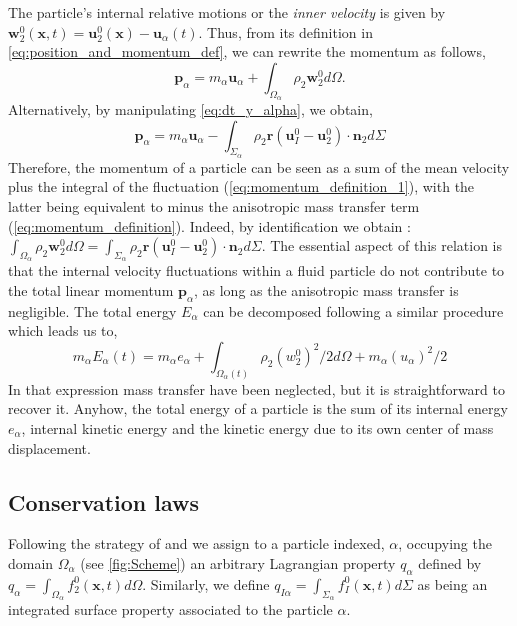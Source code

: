 The particle's internal relative motions or the \textit{inner velocity} is given by $\textbf{w}_2^0(\textbf{x},t) = \textbf{u}_2^0(\textbf{x}) - \textbf{u}_\alpha(t)$.
Thus, from its definition in \ref{eq:position_and_momentum_def}, we can rewrite the momentum as follows,
\begin{equation}
    \label{eq:momentum_definition_1}
    \textbf{p}_\alpha
    = m_\alpha \textbf{u}_\alpha
    + \int_{\Omega_\alpha} \rho_2 \textbf{w}_2^0 d\Omega.
\end{equation}
Alternatively, by manipulating \ref{eq:dt_y_alpha}, we obtain,
\begin{equation}
    \textbf{p}_\alpha
    =  m_\alpha \textbf{u}_\alpha
    - \int_{\Sigma_\alpha} \rho_2\textbf{r}(\textbf{u}_I^0 - \textbf{u}_2^0)\cdot \textbf{n}_2 d\Sigma
    \label{eq:momentum_definition}
\end{equation}
Therefore, the momentum of a particle can be seen as a sum of the mean velocity plus the integral of the fluctuation (\ref{eq:momentum_definition_1}), with the latter being equivalent to minus the anisotropic mass transfer term (\ref{eq:momentum_definition}).
Indeed, by identification we obtain : $\int_{\Omega_\alpha} \rho_2 \textbf{w}_2^0 d\Omega =\int_{\Sigma_\alpha}  \rho_2\textbf{r} (\textbf{u}_I^0 - \textbf{u}_2^0)\cdot \textbf{n}_2 d\Sigma$. 
The essential aspect of this relation is that the internal velocity fluctuations within a fluid particle do not contribute to the total linear momentum $\textbf{p}_\alpha$, as long as the anisotropic mass transfer is negligible.  
The total energy $E_\alpha$ can be decomposed following a similar procedure which leads us to, 
\begin{equation*}
    \label{eq:E_alpha_def}
    m_\alpha E_\alpha(t) 
    = m_\alpha e_\alpha 
    + \int_{\Omega_\alpha(t)} \rho_2  (w_2^0)^2/2 d\Omega
    + m_\alpha (u_\alpha)^2/2
\end{equation*}
In that expression mass transfer have been neglected, but it is straightforward to recover it. 
Anyhow, the total energy of a particle is the sum of its internal energy $e_\alpha$, internal kinetic energy and the kinetic energy due to its own center of mass displacement. 


\subsection{Conservation laws}
Following the strategy of \citet{zaepffel2011modelisation} and \citet[Chapter 2]{morel2015mathematical} we assign to a particle indexed, $\alpha$, occupying the domain $\Omega_\alpha$ (see \ref{fig:Scheme}) an arbitrary Lagrangian property $q_\alpha$ defined by $q_\alpha  = \int_{\Omega_\alpha} f_2^0(\textbf{x},t) d\Omega$.
Similarly, we define $q_{I\alpha} = \int_{\Sigma_\alpha} f_I^0(\textbf{x},t) d\Sigma$ as being an integrated surface property associated to the particle $\alpha$.


